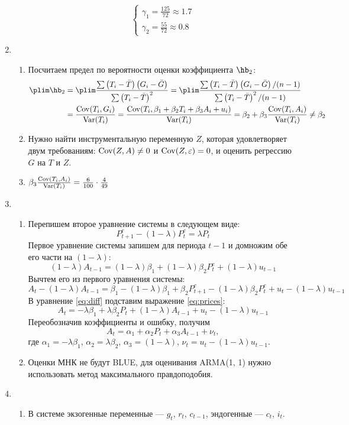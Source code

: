 \documentclass[12pt, a4paper]{article}
\theoremstyle{definition}
\begin{document}
\begin{enumerate}
\begin{enumerate}
\[\begin{cases}
\gamma_1 = \frac{125}{72} \approx 1.7 \\
\gamma_2 = \frac{55}{72} \approx 0.8
\end{cases}
\]
\end{enumerate}
\item
\begin{enumerate}
\item Посчитаем предел по вероятности оценки коэффициента $\hb_2$:
\begin{align*}
\plim \hb_2 &= 
\plim \frac{\sum \left(T_i - \bar T\right)\left(G_i - \bar G\right)}{\sum \left(T_i - \bar T\right)^2} = 
\plim \frac{\sum \left(T_i - \bar T\right)\left(G_i - \bar G\right)/(n-1)}{\sum \left(T_i - \bar T\right)^2/(n-1)} \\
&= \frac{\Cov(T_i, G_i)}{\Var(T_i)} = \frac{\Cov(T_i, \beta_1 + \beta_2 T_i + \beta_3 A_i + u_i)}{\Var(T_i)}  = 
\beta_2 + \beta_3 \frac{\Cov(T_i, A_i)}{\Var(T_i)} \neq \beta_2
\end{align*}
\item Нужно найти инструментальную переменную $Z$, которая удовлетворяет
двум требованиям: $\operatorname{Cov}(Z, A) \neq 0$ и $\operatorname{Cov}(Z, \varepsilon) = 0$,
и оценить регрессию $G$ на $T$ и $Z$.
\item $\beta_3 \frac{\operatorname{Cov}(T_i, A_i)}{\operatorname{Var}(T_i)} = \frac{6}{100} \cdot \frac{4}{49}$
\end{enumerate}
\item
\begin{enumerate}
\item Перепишем второе уравнение системы в следующем виде:
\begin{equation}\label{eq:prices}
P^e_{t+1} - (1 - \lambda) P^e_t = \lambda P_t
\end{equation}
Первое уравнение системы запишем для периода $t-1$ и домножим обе его части на $(1 - \lambda)$:
\[
(1 - \lambda) A_{t-1} = (1 - \lambda) \beta_1 + (1 - \lambda) \beta_2 P^e_t + (1 - \lambda) u_{t-1}
\]
Вычтем его из первого уравнения системы:
\begin{equation}\label{eq:diff}
A_t - (1 - \lambda) A_{t-1} = \beta_1 - (1 - \lambda) \beta_1 + \beta_2 P^e_{t+1} - (1 - \lambda) \beta_2 P^e_t + u_t - (1 - \lambda) u_{t-1}
\end{equation}
В уравнение \eqref{eq:diff} подставим выражение \eqref{eq:prices}:
\[
A_t = -\lambda \beta_1 + \lambda \beta_2 P_t + (1 - \lambda) A_{t-1} + u_t - (1 - \lambda) u_{t-1}
\]
Переобозначив коэффициенты и ошибку, получим
\[
A_t = \alpha_1 + \alpha_2 P_t + \alpha_3 A_{t-1} + \nu_t,
\]
где $\alpha_1 = -\lambda \beta_1$, $\alpha_2 = \lambda \beta_2$, $\alpha_3 =  (1 - \lambda)$,
$\nu_t = u_t - (1 - \lambda) u_{t-1}$.
\item Оценки МНК не будут BLUE, для оценивания ARMA(1, 1) нужно использовать
метод максимального правдоподобия.
\end{enumerate}
\item
\begin{enumerate}
\item В системе экзогенные переменные — $g_t$, $r_t$, $c_{t-1}$, эндогенные —
$c_t$, $i_t$.


\end{enumerate}
\end{enumerate}
\end{document}

